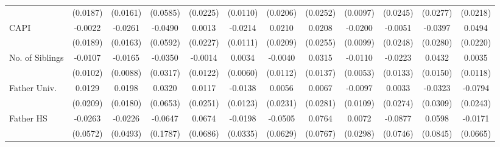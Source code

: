 \begin{table}[htbp]
\begin{tabular}{l*{11}{c}}
            &    (0.0187)         &    (0.0161)         &    (0.0585)         &    (0.0225)         &    (0.0110)         &    (0.0206)         &    (0.0252)         &    (0.0097)         &    (0.0245)         &    (0.0277)         &    (0.0218)         \\
\addlinespace
CAPI        &     -0.0022         &     -0.0261         &     -0.0490         &      0.0013         &     -0.0214         &      0.0210         &      0.0208         &     -0.0200\sym{*}  &     -0.0051         &     -0.0397         &      0.0494\sym{*}  \\
            &    (0.0189)         &    (0.0163)         &    (0.0592)         &    (0.0227)         &    (0.0111)         &    (0.0209)         &    (0.0255)         &    (0.0099)         &    (0.0248)         &    (0.0280)         &    (0.0220)         \\
\addlinespace
No. of Siblings&     -0.0107         &     -0.0165         &     -0.0350         &     -0.0014         &      0.0034         &     -0.0040         &      0.0315\sym{*}  &     -0.0110\sym{*}  &     -0.0223         &      0.0432\sym{**} &      0.0035         \\
            &    (0.0102)         &    (0.0088)         &    (0.0317)         &    (0.0122)         &    (0.0060)         &    (0.0112)         &    (0.0137)         &    (0.0053)         &    (0.0133)         &    (0.0150)         &    (0.0118)         \\
\addlinespace
Father Univ.&      0.0129         &      0.0198         &      0.0320         &      0.0117         &     -0.0138         &      0.0056         &      0.0067         &     -0.0097         &      0.0033         &     -0.0323         &     -0.0794\sym{**} \\
            &    (0.0209)         &    (0.0180)         &    (0.0653)         &    (0.0251)         &    (0.0123)         &    (0.0231)         &    (0.0281)         &    (0.0109)         &    (0.0274)         &    (0.0309)         &    (0.0243)         \\
\addlinespace
Father HS   &     -0.0263         &     -0.0226         &     -0.0647         &      0.0674         &     -0.0198         &     -0.0505         &      0.0764         &      0.0072         &     -0.0877         &      0.0598         &     -0.0171         \\
            &    (0.0572)         &    (0.0493)         &    (0.1787)         &    (0.0686)         &    (0.0335)         &    (0.0629)         &    (0.0767)         &    (0.0298)         &    (0.0746)         &    (0.0845)         &    (0.0665)         \\

\end{tabular}
\end{table}
